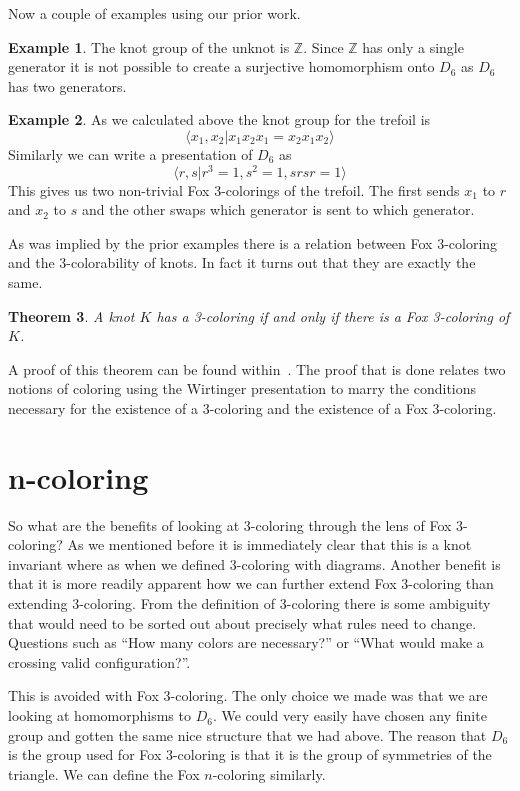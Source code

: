 \documentclass[12pt]{amsart}
\newtheorem{theorem}{Theorem}[section]
\theoremstyle{definition}
\newtheorem{example}[theorem]{Example}
\theoremstyle{remark}
\numberwithin{equation}{section}
\newcommand{\bb}[1]{\mathbb{#1}}
\begin{document}
Now a couple of examples using our prior work.

\begin{example}
  The knot group of the unknot is $\bb{Z}$. Since
  $\bb{Z}$ has only a single generator it is not possible to
  create a surjective homomorphism onto $D_6$ as $D_6$ has
  two generators.
\end{example}

\begin{example}
  As we calculated above the knot group for the trefoil is
  \[
    \langle x_1,x_2| x_1x_2x_1=x_2x_1x_2\rangle
  \]
  Similarly we can write a presentation of $D_6$ as
  \[
    \langle r,s| r^3=1, s^2=1,srsr=1\rangle
  \]
  This gives us two non-trivial Fox 3-colorings of the trefoil.
  The first sends $x_1$ to $r$ and $x_2$ to $s$ and the
  other swaps which generator is sent to which generator.
\end{example}

As was implied by the prior examples there is a relation between
Fox 3-coloring and the 3-colorability of knots. In fact it turns
out that they are exactly the same.

\begin{theorem}
  A knot $K$ has a 3-coloring if and only if there is a
  Fox 3-coloring of $K$.
\end{theorem}

A proof of this theorem can be found within~\cite{medwid}. 
The proof that is done relates two notions of coloring using
the Wirtinger presentation to marry the conditions necessary
for the existence of a 3-coloring and the existence of a Fox
3-coloring.

\section{n-coloring}
\label{sec:n-coloring}

So what are the benefits of looking at 3-coloring through
the lens of Fox 3-coloring? As we mentioned before it is
immediately clear that this is a knot invariant where as
when we defined 3-coloring with diagrams. Another benefit
is that it is more readily apparent how we can further
extend Fox 3-coloring than extending 3-coloring. From
the definition of 3-coloring there is some ambiguity that
would need to be sorted out about precisely what rules need
to change. Questions such as ``How many colors are necessary?''
or ``What would make a crossing valid configuration?''.

This is avoided with Fox 3-coloring. The only choice we made
was that we are looking at homomorphisms to $D_6$. We could
very easily have chosen any finite group and gotten the
same nice structure that we had above. The reason that
$D_6$ is the group used for Fox 3-coloring is that it is
the group of symmetries of the triangle. We can
define the Fox $n$-coloring similarly.
\end{document}

